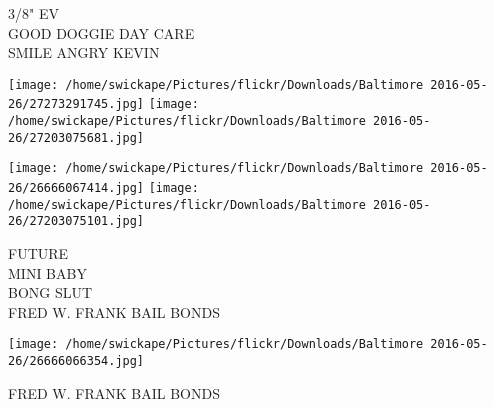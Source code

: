 \documentclass[10pt,letterpaper]{article}
\begin{document}
3/8" EV\\
GOOD DOGGIE DAY CARE\\
SMILE ANGRY KEVIN\\
\pagebreak

\texttt{[image: /home/swickape/Pictures/flickr/Downloads/Baltimore 2016-05-26/27273291745.jpg]}
\texttt{[image: /home/swickape/Pictures/flickr/Downloads/Baltimore 2016-05-26/27203075681.jpg]}

\texttt{[image: /home/swickape/Pictures/flickr/Downloads/Baltimore 2016-05-26/26666067414.jpg]}
\texttt{[image: /home/swickape/Pictures/flickr/Downloads/Baltimore 2016-05-26/27203075101.jpg]}

FUTURE\\
MINI BABY\\
BONG SLUT\\
FRED W. FRANK BAIL BONDS\\
\pagebreak

\texttt{[image: /home/swickape/Pictures/flickr/Downloads/Baltimore 2016-05-26/26666066354.jpg]}

FRED W. FRANK BAIL BONDS\\
\pagebreak
\end{document}
